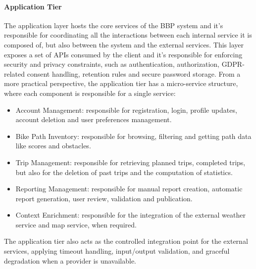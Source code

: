\paragraph{Application Tier}
The application layer hosts the core services of the BBP system and it's responsible for coordinating all the interactions between each internal service it is composed of, but also between the system and the external services. This layer exposes a set of APIs consumed by the client and it's responsible for enforcing security and privacy constraints, such as authentication, authorization, GDPR-related consent handling, retention rules and secure password storage. From a more practical perspective, the application tier has a micro-service structure, where each component is responsible for a single service:
\begin{itemize}
    \item Account Management: responsible for registration, login, profile updates, account deletion and user preferences management.
    \item Bike Path Inventory: responsible for browsing, filtering and getting path data like scores and obstacles.
    \item Trip Management: responsible for retrieving planned trips, completed trips, but also for the deletion of past trips and the computation of statistics.
    \item Reporting Management: responsible for manual report creation, automatic report generation, user review, validation and publication.
    \item Context Enrichment: responsible for the integration of the external weather service and map service, when required.
\end{itemize}
The application tier also acts as the controlled integration point for the external services, applying timeout handling, input/output validation, and graceful degradation when a provider is unavailable.

